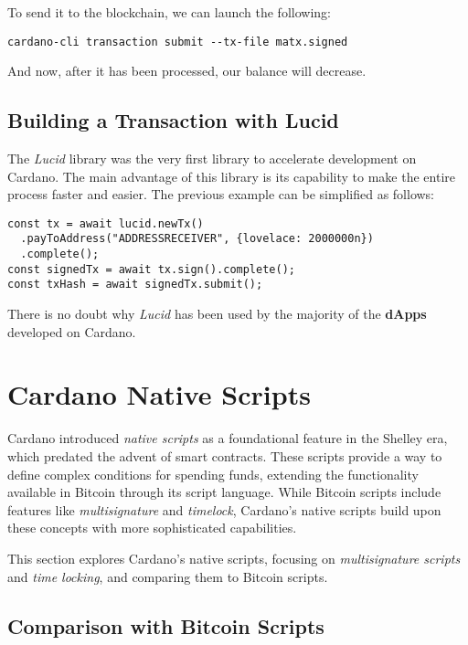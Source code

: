 To send it to the blockchain, we can launch the following:

\begin{lstlisting}
cardano-cli transaction submit --tx-file matx.signed
\end{lstlisting}

And now, after it has been processed, our balance will decrease.

\subsection{Building a Transaction with Lucid}

The \textit{Lucid} library was the very first library to accelerate development on Cardano. The main advantage of this library is its capability to make the entire process faster and easier. The previous example can be simplified as follows:

\begin{lstlisting}
const tx = await lucid.newTx()
  .payToAddress("ADDRESSRECEIVER", {lovelace: 2000000n})
  .complete();
const signedTx = await tx.sign().complete();
const txHash = await signedTx.submit();
\end{lstlisting}

There is no doubt why \textit{Lucid} has been used by the majority of the \textbf{dApps} developed on Cardano.

\section{Cardano Native Scripts}

Cardano introduced \textit{native scripts} as a foundational feature in the Shelley era, which predated the advent of smart contracts. These scripts provide a way to define complex conditions for spending funds, extending the functionality available in Bitcoin through its script language. While Bitcoin scripts include features like \textit{multisignature} and \textit{timelock}, Cardano's native scripts build upon these concepts with more sophisticated capabilities.

This section explores Cardano's native scripts, focusing on \textit{multisignature scripts} and \textit{time locking}, and comparing them to Bitcoin scripts. 

\subsection{Comparison with Bitcoin Scripts}

